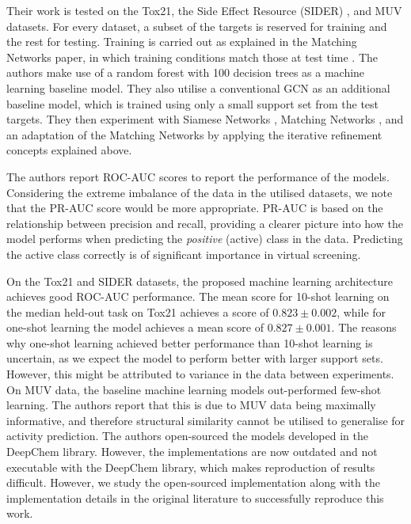 Their work is tested on the Tox21, the Side Effect Resource (SIDER) \citep{kuhn2016sider}, and MUV datasets. For every dataset, a subset of the targets is reserved for training and the rest for testing. Training is carried out as explained in the Matching Networks paper, in which training conditions match those at test time \citep{vinyals2016matching}. The authors make use of a random forest with 100 decision trees as a machine learning baseline model. They also utilise a conventional GCN as an additional baseline model, which is trained using only a small support set from the test targets. They then experiment with Siamese Networks \citep{koch2015siamese}, Matching Networks \citep{vinyals2016matching}, and an adaptation of the Matching Networks by applying the iterative refinement concepts explained above.

The authors report ROC-AUC scores to report the performance of the models. Considering the extreme imbalance of the data in the utilised datasets, we note that the PR-AUC score would be more appropriate. PR-AUC is based on the relationship between precision and recall, providing a clearer picture into how the model performs when predicting the \textit{positive} (active) class in the data. Predicting the active class correctly is of significant importance in virtual screening.

On the Tox21 and SIDER datasets, the proposed machine learning architecture achieves good ROC-AUC performance. The mean score for 10-shot learning on the median held-out task on Tox21 achieves a score of $0.823 \pm 0.002$, while for one-shot learning  the model achieves a mean score of $0.827 \pm 0.001$. The reasons why one-shot learning achieved better performance than 10-shot learning is uncertain, as we expect the model to perform better with larger support sets. However, this might be attributed to variance in the data between experiments. On MUV data, the baseline machine learning models out-performed few-shot learning. The authors report that this is due to MUV data being maximally informative, and therefore structural similarity cannot be utilised to generalise for activity prediction. The authors open-sourced the models developed in the DeepChem library. However, the implementations are now outdated and not executable with the DeepChem library, which makes reproduction of results difficult. However, we study the open-sourced implementation along with the implementation details in the original literature to successfully reproduce this work.
